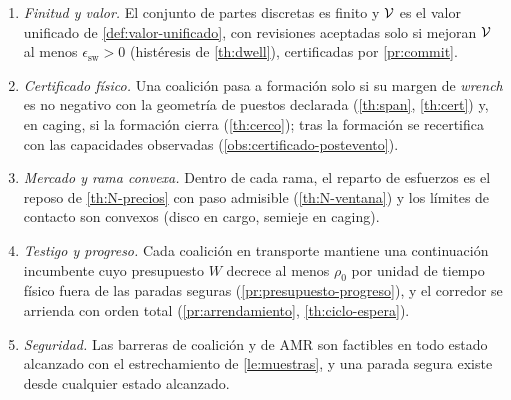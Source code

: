 \begin{supuesto}
\label{s:cierre}
\begin{enumerate}[label=(A\arabic*),leftmargin=2.6em,topsep=0.2em,itemsep=0.1em]
  \item \emph{Finitud y valor.} El conjunto de partes discretas es finito y
  $\mathcal{V}$ es el valor unificado de \cref{def:valor-unificado}, con revisiones
  aceptadas solo si mejoran $\mathcal{V}$ al menos $\epsilon_{\mathrm{sw}}>0$
  (histéresis de \cref{th:dwell}), certificadas por \cref{pr:commit}.
  \item \emph{Certificado físico.} Una coalición pasa a formación solo si su
  margen de \emph{wrench} es no negativo con la geometría de puestos declarada
  (\cref{th:span}, \cref{th:cert}) y, en \textsf{caging}, si la formación
  cierra (\cref{th:cerco}); tras la formación se recertifica con las
  capacidades observadas (\cref{obs:certificado-postevento}).
  \item \emph{Mercado y rama convexa.} Dentro de cada rama, el reparto de
  esfuerzos es el reposo de \cref{th:N-precios} con paso admisible
  (\cref{th:N-ventana}) y los límites de contacto son convexos (disco en
  \textsf{cargo}, semieje en \textsf{caging}).
  \item \emph{Testigo y progreso.} Cada coalición en transporte mantiene una
  continuación incumbente cuyo presupuesto $W$ decrece al menos $\rho_0$ por
  unidad de tiempo físico fuera de las paradas seguras
  (\cref{pr:presupuesto-progreso}), y el corredor se arrienda con orden total
  (\cref{pr:arrendamiento}, \cref{th:ciclo-espera}).
  \item \emph{Seguridad.} Las barreras de coalición y de AMR son factibles en
  todo estado alcanzado con el estrechamiento de \cref{le:muestras}, y una
  parada segura existe desde cualquier estado alcanzado.
\end{enumerate}
\end{supuesto}

